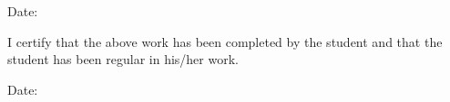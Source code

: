 
\vspace{3cm} %
\noindent Date: \hfill \name

\vspace{1cm} %
\noindent I certify that the above work has been completed by the student and that the student has been regular in his/her work.

\vspace{2cm} %
\noindent Date: \hfill \supervisor

\hfill {\small \affiliation}